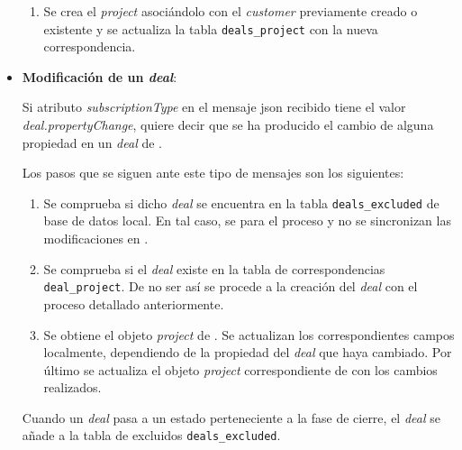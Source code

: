 \begin{itemize}
\begin{enumerate}
			\item Se crea el \textit{project} asociándolo con el \textit{customer} previamente creado o existente y se actualiza la tabla \texttt{deals\_project} con la nueva correspondencia.
		\end{enumerate}
		
		
		
		
		
		
	\item \textbf{Modificación de un \textit{deal}}:
	
		Si atributo \textit{subscriptionType} en el mensaje \acrshort{json} recibido tiene el valor \textit{deal.propertyChange}, quiere decir que se ha producido el cambio de alguna propiedad en un \textit{deal} de \hs{}.
		
		Los pasos que se siguen ante este tipo de mensajes son los siguientes:
		
		\begin{enumerate}
			\item Se comprueba si dicho \textit{deal} se encuentra en la tabla \texttt{deals\_excluded} de base de datos local. En tal caso, se para el proceso y no se sincronizan las modificaciones en \wday{}.
			\item Se comprueba si el \textit{deal} existe en la tabla de correspondencias \texttt{deal\_project}. De no ser así se procede a la creación del \textit{deal} con el proceso detallado anteriormente.
			\item Se obtiene el objeto \textit{project} de \wday{}. Se actualizan los correspondientes campos localmente, dependiendo de la propiedad del \textit{deal} que haya cambiado. Por último se actualiza el objeto \textit{project} correspondiente de \wday{} con los cambios realizados.
		\end{enumerate}
		
		
		
		Cuando un \textit{deal} pasa a un estado perteneciente a la fase de cierre, el \textit{deal} se añade a la tabla de excluidos \texttt{deals\_excluded}.
		
		
		

\end{itemize}



